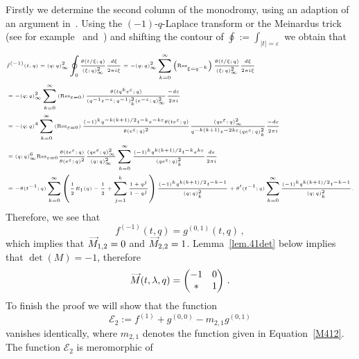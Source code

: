 \documentclass[12pt,reqno]{amsart}
\theoremstyle{definition}
\def\calE{\mathcal E}
\def\Res{\mathrm{Res}}
\def\ve{\varepsilon}
\def\be{\begin{equation}}
\def\ee{\end{equation}}
\def\vM{\accentset{\longrightarrow}{M}}
\begin{document}
Firstly we determine the second column of the monodromy, using an adaption of an
argument in~\cite{Morita:conn-mon}. Using the $(-1)$-$q$-Laplace transform or the
Meinardus trick (see for example~\cite{Meinardus} and~\cite[p.54]{Zagier:dilog})
and shifting the contour of $\oint:=\int_{|t|=\ve}$ we obtain that
\be
\begin{tiny}
\begin{aligned}
  \label{f1=g01}
&\hat{f}^{(-1)}(t,q)%
=
(q;q)_{\infty}^{2}\oint_{0}\frac{\theta(t/\xi;q)}{(\xi;q)_{\infty}^{2}}
\frac{d\xi}{2\pi i \xi}%
=
-(q;q)_{\infty}^{2}\sum_{k=0}^{\infty}\left(\Res_{\xi=q^{-k}}\right)
\frac{\theta(t/\xi;q)}{(\xi;q)_{\infty}^{2}}\frac{d\xi}{2\pi i \xi}\\
&=
-(q;q)_{\infty}^{2}\sum_{k=0}^{\infty}\left(\Res_{\ve=0}\right)
\frac{\theta(tq^{k}e^{\ve};q)}{(q^{-1}e^{-\ve};q^{-1})_{k}^2
  (e^{-\ve};q)_{\infty}^{2}}\frac{-d\ve}{2\pi i }\\
&=
-(q;q)^{4}\sum_{k=0}^{\infty}\left(\Res_{\ve=0}\right)
\frac{(-1)^{k}q^{-k(k+1)/2}t^{-k}e^{-k\ve}
  \theta(te^{\ve};q)}{\theta(e^{\ve};q)^{2}}
\frac{(qe^{\ve};q)_{\infty}^{2}}{q^{-k(k+1)}
  e^{-2k\ve}(qe^{\ve};q)_{k}^2}\frac{-d\ve}{2\pi i }\\
&=
(q;q)_{\infty}^{6}\Res_{\ve=0}
\frac{\theta(te^{\ve};q)}{\theta(e^{\ve};q)^{2}}
\frac{(qe^{\ve};q)_{\infty}^{2}}{(q;q)_{\infty}^{2}}
\sum_{k=0}^{\infty}
\frac{(-1)^{k}q^{k(k+1)/2}t^{-k}e^{k\ve}}{(qe^{\ve};q)_{k}^2}
\frac{d\ve}{2\pi i }\\
&=
-\theta(t^{-1};q)\sum_{k=0}^{\infty}\left(\frac{1}{2}E_{1}(q)-\frac{1}{2}+\sum_{j=1}^{k}\frac{1+q^{j}}{1-q^{j}}\right)
\frac{(-1)^{k}q^{k(k+1)/2}t^{-k-1}}{(q;q)_{k}^2}+\theta'(t^{-1};q)
\sum_{k=0}^{\infty}\frac{(-1)^{k}q^{k(k+1)/2}t^{-k-1}}{(q;q)_{k}^2}.
\end{aligned}
\end{tiny}
\ee
Therefore, we see that
\be\label{fg}
f^{(-1)}(t,q)
=
g^{(0,1)}(t,q) \,, 
\ee
which implies that $\vM_{1,2}=0$ and $\vM_{2,2}=1$. Lemma~\ref{lem.41det} below
implies that $\det(M)=-1$, therefore 
\be
\label{41:paritalmono}
\vM(t,\lambda,q) =
\begin{pmatrix}
-1 & 0\\
* & 1
\end{pmatrix} \,.
\ee
To finish the proof we will show that the function
\be
\label{41mono:intfunc}
\calE_2:=f^{(1)}+g^{(0,0)}-m_{2,1}g^{(0,1)}
\ee
vanishes identically, where $m_{2,1}$ denotes the function given in
Equation~\eqref{M412}. The function $\calE_2$ is meromorphic of
\end{document}
